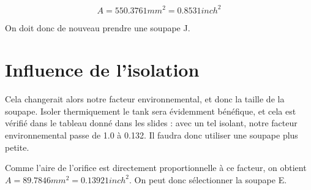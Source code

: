 $$A=550.3761mm^2=0.8531inch^2$$

On doit donc de nouveau prendre une soupape J.

\section{Influence de l'isolation}
Cela changerait alors notre facteur environnemental, et donc la taille de la soupape. Isoler thermiquement le tank sera évidemment bénéfique, et cela est vérifié dans le tableau donné dans les slides : avec un tel isolant, notre facteur environnemental passe de 1.0 à 0.132. Il faudra donc utiliser une soupape plus petite. 

Comme l'aire de l'orifice est directement proportionnelle à ce facteur, on obtient $A=89.7846mm^2=0.13921inch^2$.
On peut donc sélectionner la soupape E.
